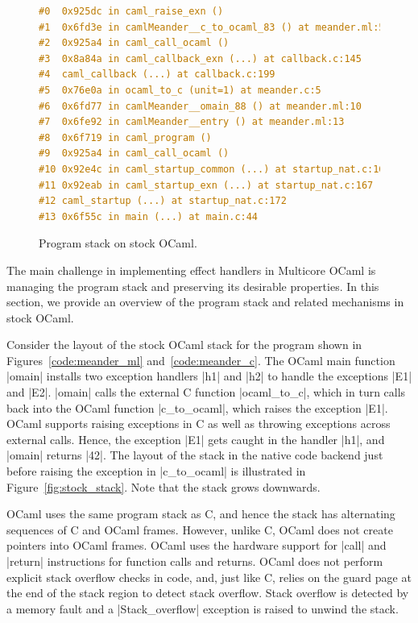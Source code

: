 \documentclass[sigplan,screen]{acmart}
\begin{document}
\begin{figure}
\begin{minipage}{0.30\linewidth}
  \label{fig:stock_stack}
\end{minipage}
%
\begin{minipage}{0.39\linewidth}
\begin{lstlisting}[language=c,basicstyle=\ttfamily\footnotesize]
#0  0x925dc in caml_raise_exn ()
#1  0x6fd3e in camlMeander__c_to_ocaml_83 () at meander.ml:5
#2  0x925a4 in caml_call_ocaml ()
#3  0x8a84a in caml_callback_exn (...) at callback.c:145
#4  caml_callback (...) at callback.c:199
#5  0x76e0a in ocaml_to_c (unit=1) at meander.c:5
#6  0x6fd77 in camlMeander__omain_88 () at meander.ml:10
#7  0x6fe92 in camlMeander__entry () at meander.ml:13
#8  0x6f719 in caml_program ()
#9  0x925a4 in caml_call_ocaml ()
#10 0x92e4c in caml_startup_common (...) at startup_nat.c:162
#11 0x92eab in caml_startup_exn (...) at startup_nat.c:167
#12 caml_startup (...) at startup_nat.c:172
#13 0x6f55c in main (...) at main.c:44
\end{lstlisting}
\label{code:gdb_backtrace}
\end{minipage}
\caption{Program stack on stock OCaml.}
\end{figure}

The main challenge in implementing effect handlers in Multicore OCaml is
managing the program stack and preserving its desirable properties. In this
section, we provide an overview of the program stack and related mechanisms in
stock OCaml.

Consider the layout of the stock OCaml stack for the program shown in
Figures~\ref{code:meander_ml} and~\ref{code:meander_c}. The OCaml main function
|omain| installs two exception handlers |h1| and |h2| to handle the exceptions
|E1| and |E2|. |omain| calls the external C function |ocaml_to_c|, which in
turn calls back into the OCaml function |c_to_ocaml|, which raises the
exception |E1|. OCaml supports raising exceptions in C as well as throwing
exceptions across external calls. Hence, the exception |E1| gets caught in the
handler |h1|, and |omain| returns |42|. The layout of the stack in the native
code backend just before raising the exception in |c_to_ocaml| is illustrated
in Figure~\ref{fig:stock_stack}. Note that the stack grows downwards.

OCaml uses the same program stack as C, and hence the stack has
alternating sequences of C and OCaml frames. However, unlike C, OCaml does not
create pointers into OCaml frames. OCaml uses the hardware support for |call|
and |return| instructions for function calls and returns. OCaml does not
perform explicit stack overflow checks in code, and, just like C, relies on the
guard page at the end of the stack region to detect stack overflow. Stack
overflow is detected by a memory fault and a |Stack_overflow| exception is
raised to unwind the stack.
\end{document}

